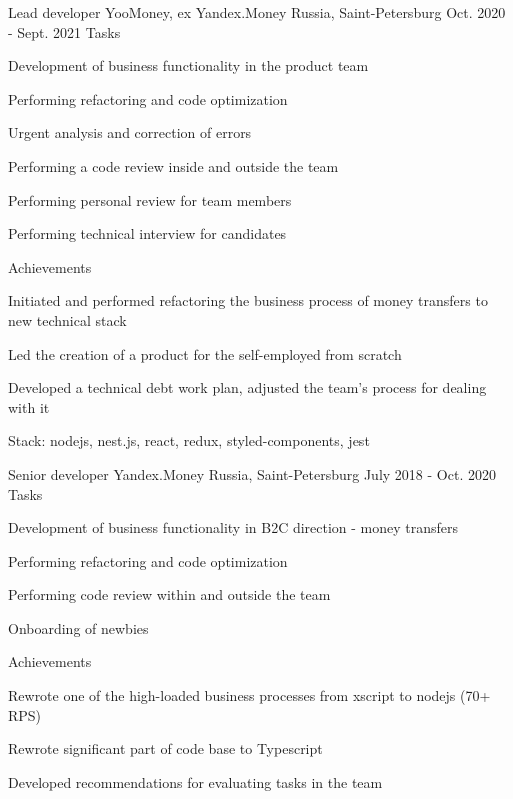 \begin{cventries}
  \cvmultientry
    {Lead developer}
    {YooMoney, ex Yandex.Money}
    {Russia, Saint-Petersburg}
    {Oct. 2020 - Sept. 2021}
    {Tasks}
    {
      \begin{cvitems}
        \item {Development of business functionality in the product team}
        \item {Performing refactoring and code optimization}
        \item {Urgent analysis and correction of errors}
        \item {Performing a code review inside and outside the team}
        \item {Performing personal review for team members}
        \item {Performing technical interview for candidates}
      \end{cvitems}
    }
    {Achievements}
    {
      \begin{cvitems}
        \item {Initiated and performed refactoring the business process of money transfers to new technical stack}
        \item {Led the creation of a product for the self-employed from scratch}
        \item {Developed a technical debt work plan, adjusted the team's process for dealing with it}
      \end{cvitems}
    }

    \begin{cvskills}
      \cvskill
        {Stack:}
        {nodejs, nest.js, react, redux, styled-components, jest}
    \end{cvskills}

  \cvmultientry
    {Senior developer}
    {Yandex.Money}
    {Russia, Saint-Petersburg}
    {July 2018 - Oct. 2020}
    {Tasks}
    {
      \begin{cvitems}
        \item {Development of business functionality in B2C direction - money transfers}
        \item {Performing refactoring and code optimization}
        \item {Performing code review within and outside the team}
        \item {Onboarding of newbies}
      \end{cvitems}
    }
    {Achievements}
    {
      \begin{cvitems}
        \item {Rewrote one of the high-loaded business processes from xscript to nodejs (70+ RPS)}
        \item {Rewrote significant part of code base to Typescript}
        \item {Developed recommendations for evaluating tasks in the team}
      \end{cvitems}
    }


\end{cventries}
